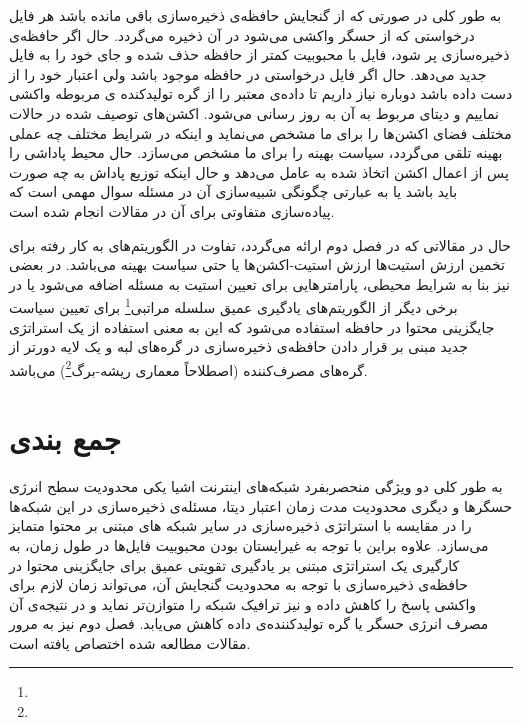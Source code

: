 به طور کلی در صورتی که از گنجایش حافظه‌ی ذخیره‌سازی باقی مانده باشد هر فایل درخواستی که از حسگر واکشی می‌شود در آن ذخیره می‌گردد. حال اگر حافظه‌ی ذخیره‌سازی پر شود، فایل با محبوبیت کمتر از حافظه حذف شده و جای خود را به فایل جدید می‌دهد. حال اگر فایل درخواستی در حافظه موجود باشد ولی اعتبار خود را از دست داده باشد دوباره نیاز داریم تا داده‌ی معتبر را از گره تولیدکنده ی مربوطه واکشی نماییم و دیتای مربوط به آن به روز رسانی می‌شود. اکشن‌های توصیف شده در حالات مختلف فضای اکشن‌ها را برای ما مشخص می‌نماید و اینکه در شرایط مختلف چه عملی بهینه تلقی می‌گردد، سیاست بهینه را برای ما مشخص می‌سازد. حال محیط پاداشی را پس از اعمال اکشن اتخاذ شده به عامل می‌دهد و حال اینکه توزیع پاداش به چه صورت باید باشد یا به عبارتی چگونگی شبیه‌سازی آن در مسئله‌ سوال مهمی است که پیاده‌سازی متفاوتی برای آن در مقالات انجام شده است. 
 
 حال در  مقالاتی که در فصل دوم ارائه می‌گردد، تفاوت در الگوریتم‌های به کار رفته برای تخمین ارزش استیت‌ها ارزش استیت-اکشن‌ها یا حتی سیاست بهینه می‌باشد. در بعضی نیز بنا به شرایط محیطی، پارامترهایی برای تعیین استیت به مسئله اضافه می‌شود یا در برخی دیگر از الگوریتم‌های یادگیری عمیق سلسله مراتبی\footnote{} برای تعیین سیاست جایگزینی محتوا در حافظه استفاده می‌شود که این به معنی استفاده از یک استراتژی جدید مبنی بر قرار دادن حافظه‌ی ذخیره‌سازی در گره‌های لبه و یک لایه دورتر از گره‌های مصرف‌کننده (اصطلاحاً معماری ریشه-برگ\footnote{}) می‌باشد.

\section{جمع بندی}
به طور کلی دو ویژگی منحصربفرد شبکه‌های اینترنت اشیا یکی محدودیت سطح انرژی حسگرها و دیگری محدودیت مدت زمان اعتبار دیتا، مسئله‌ی ذخیره‌سازی در این شبکه‌ها را در مقایسه با استراتژی ذخیره‌سازی در سایر شبکه های مبتنی بر محتوا متمایز می‌سازد. علاوه براین با توجه به غیرایستان بودن محبوبیت فایل‌ها در طول زمان، به کارگیری یک استراتژی مبتنی بر یادگیری تقویتی عمیق برای جایگزینی محتوا در حافظه‌ی ذخیره‌سازی با توجه به محدودیت گنجایش آن، می‌تواند زمان لازم برای واکشی پاسخ را کاهش داده و نیز ترافیک شبکه را متوازن‌تر نماید و در نتیجه‌ی آن مصرف انرژی حسگر یا گره تولیدکننده‌ی داده کاهش می‌یابد. فصل دوم نیز به مرور مقالات مطالعه شده اختصاص یافته است.





